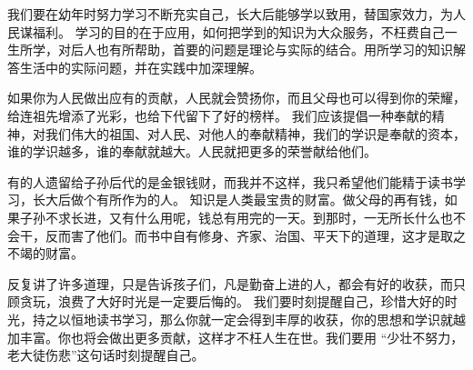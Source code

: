 \documentclass[avery5371,grid]{flashcards}
\begin{document}
{我们要在幼年时努力学习不断充实自己，长大后能够学以致用，替国家效力，为人民谋福利。} %
{学习的目的在于应用，如何把学到的知识为大众服务，不枉费自己一生所学，对后人也有所帮助，首要的问题是理论与实际的结合。用所学习的知识解答生活中的实际问题，并在实践中加深理解。} %

{如果你为人民做出应有的贡献，人民就会赞扬你，而且父母也可以得到你的荣耀，给连祖先增添了光彩，也给下代留下了好的榜样。} %
{我们应该提倡一种奉献的精神，对我们伟大的祖国、对人民、对他人的奉献精神，我们的学识是奉献的资本，谁的学识越多，谁的奉献就越大。人民就把更多的荣誉献给他们。} %

{有的人遗留给子孙后代的是金银钱财，而我并不这样，我只希望他们能精于读书学习，长大后做个有所作为的人。} %
{知识是人类最宝贵的财富。做父母的再有钱，如果子孙不求长进，又有什么用呢，钱总有用完的一天。到那时，一无所长什么也不会干，反而害了他们。而书中自有修身、齐家、治国、平天下的道理，这才是取之不竭的财富。} %

{反复讲了许多道理，只是告诉孩子们，凡是勤奋上进的人，都会有好的收获，而只顾贪玩，浪费了大好时光是一定要后悔的。} %
{我们要时刻提醒自己，珍惜大好的时光，持之以恒地读书学习，那么你就一定会得到丰厚的收获，你的思想和学识就越加丰富。你也将会做出更多贡献，这样才不枉人生在世。我们要用 “少壮不努力，老大徒伤悲”这句话时刻提醒自己。} %



\end{document}
